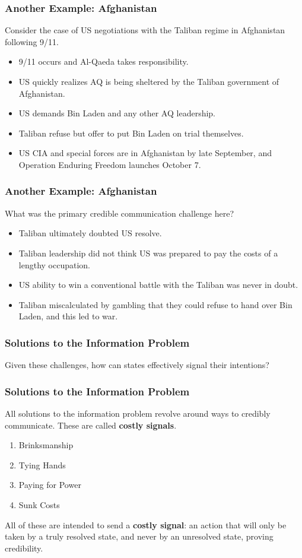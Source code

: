\documentclass{beamer}
\begin{document}
\begin{frame} 
	\frametitle{\LARGE{Another Example: Afghanistan}}
	Consider the case of US negotiations with the Taliban regime in Afghanistan following 9/11.
	\begin{itemize}
		\item 9/11 occurs and Al-Qaeda takes responsibility. \pause
		\item US quickly realizes AQ is being sheltered by the Taliban government of Afghanistan. \pause
		\item US demands Bin Laden and any other AQ leadership. \pause
		\item Taliban refuse but offer to put Bin Laden on trial themselves. \pause
		\item US CIA and special forces are in Afghanistan by late September, and Operation Enduring Freedom launches October 7.
	\end{itemize}
\end{frame}

\begin{frame} 
	\frametitle{\LARGE{Another Example: Afghanistan}}
What was the primary credible communication challenge here? \pause
	\begin{itemize}
		\item Taliban ultimately doubted US resolve. \pause
		\item Taliban leadership did not think US was prepared to pay the costs of a lengthy occupation. \pause
		\item US ability to win a conventional battle with the Taliban was never in doubt. \pause
		\item Taliban miscalculated by gambling that they could refuse to hand over Bin Laden, and this led to war. 
	\end{itemize}
\end{frame}

\begin{frame} 
\frametitle{\LARGE{Solutions to the Information Problem}}
\begin{itemize}
	\Large{
			\item Given these challenges, how can states effectively signal their intentions?
	}
\end{itemize}
\end{frame}

\begin{frame} 
	\frametitle{\LARGE{Solutions to the Information Problem}}
All solutions to the information problem revolve around ways to credibly communicate. These are called \textbf{costly signals}. 
	\begin{enumerate}
		\item Brinksmanship \pause
		\item Tying Hands \pause
		\item Paying for Power \pause
		\item Sunk Costs \pause
	\end{enumerate}
All of these are intended to send a \textbf{costly signal}: an action that will only be taken by a truly resolved state, and never by an unresolved state, proving credibility.
\end{frame}
\end{document}
